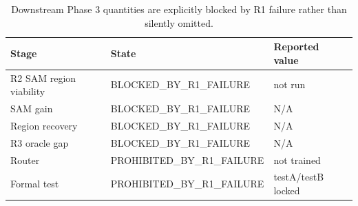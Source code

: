 \begin{table}[t]
\centering
\small
\caption{Downstream Phase 3 quantities are explicitly blocked by R1 failure rather than silently omitted.}
\label{tab:downstream_status}
\begin{tabular}{lll}
\hline
Stage & State & Reported value \\
\hline
R2 SAM region viability & BLOCKED\_BY\_R1\_FAILURE & not run \\
SAM gain & BLOCKED\_BY\_R1\_FAILURE & N/A \\
Region recovery & BLOCKED\_BY\_R1\_FAILURE & N/A \\
R3 oracle gap & BLOCKED\_BY\_R1\_FAILURE & N/A \\
Router & PROHIBITED\_BY\_R1\_FAILURE & not trained \\
Formal test & PROHIBITED\_BY\_R1\_FAILURE & testA/testB locked \\
\hline
\end{tabular}
\end{table}
